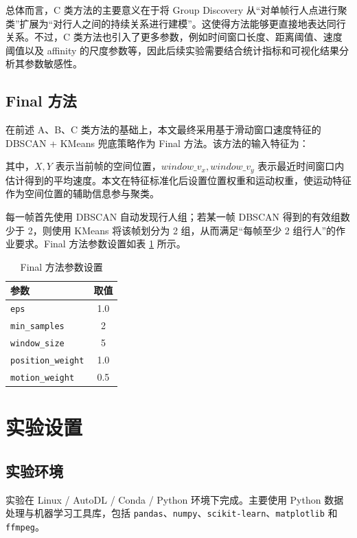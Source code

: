 \documentclass[UTF8,a4paper,12pt]{ctexart}
\begin{document}
总体而言，C 类方法的主要意义在于将 Group Discovery 从“对单帧行人点进行聚类”扩展为“对行人之间的持续关系进行建模”。这使得方法能够更直接地表达同行关系。不过，C 类方法也引入了更多参数，例如时间窗口长度、距离阈值、速度阈值以及 affinity 的尺度参数等，因此后续实验需要结合统计指标和可视化结果分析其参数敏感性。

\subsection{Final 方法}

在前述 A、B、C 类方法的基础上，本文最终采用基于滑动窗口速度特征的 DBSCAN + KMeans 兜底策略作为 Final 方法。该方法的输入特征为：
\begin{equation}
[X,Y,window\_v_x,window\_v_y]
\end{equation}

其中，$X,Y$ 表示当前帧的空间位置，$window\_v_x,window\_v_y$ 表示最近时间窗口内估计得到的平均速度。本文在特征标准化后设置位置权重和运动权重，使运动特征作为空间位置的辅助信息参与聚类。

每一帧首先使用 DBSCAN 自动发现行人组；若某一帧 DBSCAN 得到的有效组数少于 2，则使用 KMeans 将该帧划分为 2 组，从而满足“每帧至少 2 组行人”的作业要求。Final 方法参数设置如表 \ref{tab:final-params} 所示。

\begin{table}[H]
\centering
\caption{Final 方法参数设置}
\label{tab:final-params}
\begin{tabular}{lc}
\toprule
参数 & 取值 \\
\midrule
\texttt{eps} & 1.0 \\
\texttt{min\_samples} & 2 \\
\texttt{window\_size} & 5 \\
\texttt{position\_weight} & 1.0 \\
\texttt{motion\_weight} & 0.5 \\
\bottomrule
\end{tabular}
\end{table}

\section{实验设置}

\subsection{实验环境}

实验在 Linux / AutoDL / Conda / Python 环境下完成。主要使用 Python 数据处理与机器学习工具库，包括 \texttt{pandas}、\texttt{numpy}、\texttt{scikit-learn}、\texttt{matplotlib} 和 \texttt{ffmpeg}。
\end{document}
